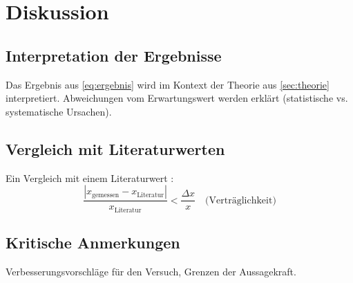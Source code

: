 \section{Diskussion}
\label{sec:diskussion}

\subsection{Interpretation der Ergebnisse}
Das Ergebnis aus \cref{eq:ergebnis} wird im Kontext der Theorie aus
\cref{sec:theorie} interpretiert. Abweichungen vom Erwartungswert werden
erklärt (statistische vs. systematische Ursachen).

\subsection{Vergleich mit Literaturwerten}
Ein Vergleich mit einem Literaturwert \cite{Example2023}:
\begin{equation}
  \frac{|x_{\text{gemessen}} - x_{\text{Literatur}}|}{x_{\text{Literatur}}} < \frac{\Delta x}{x}
  \quad \text{(Verträglichkeit)}
\end{equation}

\subsection{Kritische Anmerkungen}
Verbesserungsvorschläge für den Versuch, Grenzen der Aussagekraft.
